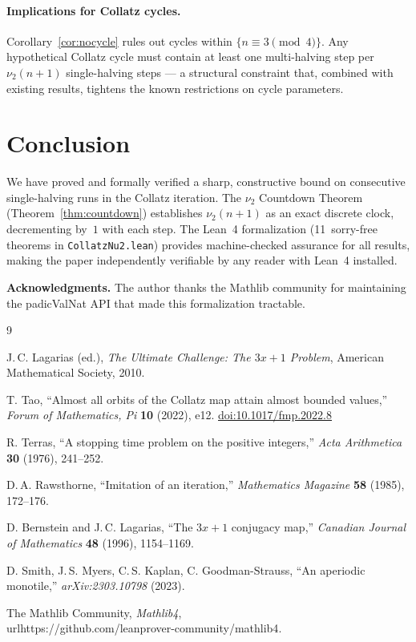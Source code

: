 \documentclass[12pt]{article}
\newcommand{\vp}{\nu_2}
\begin{document}
\paragraph{Implications for Collatz cycles.}
Corollary~\ref{cor:nocycle} rules out cycles within $\{n\equiv 3\pmod
4\}$.  Any hypothetical Collatz cycle must contain at least one
multi-halving step per $\vp(n+1)$ single-halving steps --- a structural
constraint that, combined with existing results, tightens the known
restrictions on cycle parameters.

\section{Conclusion}

We have proved and formally verified a sharp, constructive bound on
consecutive single-halving runs in the Collatz iteration.  The $\nu_2$
Countdown Theorem (Theorem~\ref{thm:countdown}) establishes $\vp(n+1)$
as an exact discrete clock, decrementing by~$1$ with each step.  The
Lean~4 formalization (11~sorry-free theorems in
\texttt{CollatzNu2.lean}) provides machine-checked assurance for all
results, making the paper independently verifiable by any reader with
Lean~4 installed.

\bigskip
\noindent\textbf{Acknowledgments.}
The author thanks the Mathlib community for maintaining the padicValNat
API that made this formalization tractable.

\begin{thebibliography}{9}

J.\,C. Lagarias (ed.),
\emph{The Ultimate Challenge: The $3x+1$ Problem},
American Mathematical Society, 2010.

T. Tao,
``Almost all orbits of the Collatz map attain almost bounded values,''
\emph{Forum of Mathematics, Pi} \textbf{10} (2022), e12.
\href{https://doi.org/10.1017/fmp.2022.8}{doi:10.1017/fmp.2022.8}

R. Terras,
``A stopping time problem on the positive integers,''
\emph{Acta Arithmetica} \textbf{30} (1976), 241--252.

D.\,A. Rawsthorne,
``Imitation of an iteration,''
\emph{Mathematics Magazine} \textbf{58} (1985), 172--176.

D. Bernstein and J.\,C. Lagarias,
``The $3x+1$ conjugacy map,''
\emph{Canadian Journal of Mathematics} \textbf{48} (1996), 1154--1169.

D. Smith, J.\,S. Myers, C.\,S. Kaplan, C. Goodman-Strauss,
``An aperiodic monotile,''
\emph{arXiv:2303.10798} (2023).

The Mathlib Community,
\emph{Mathlib4},
\\url{https://github.com/leanprover-community/mathlib4}.

\end{thebibliography}
\end{document}
